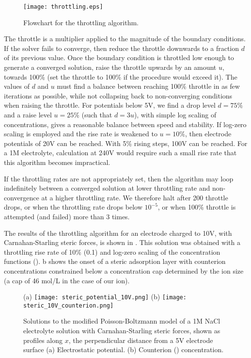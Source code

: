 \begin{figure}
\centering
\texttt{[image: throttling.eps]}
\caption{\label{fig_throttling_algorithm}Flowchart for the throttling algorithm. }
\end{figure}

The throttle is a multiplier
applied to the magnitude of the boundary conditions.
If the solver fails to converge, then reduce the throttle downwards to
a fraction $d$ of its previous value. Once the boundary
condition is throttled low enough to generate a converged solution, raise
the throttle upwards by an amount $u$, towards 100\% (set the throttle
to 100\% if the procedure would exceed it).  The values of $d$ and $u$
must find a balance between reaching 100\% throttle in as few
iterations as possible, while not collapsing back to non-converging
conditions when raising the throttle.  For potentials below 5V, we
find a drop level $d=75\%$ and a raise level $u=25\%$ (such that
$d=3u$), with simple log
scaling of concentrations, gives a reasonable balance between speed and
stability. If log-zero scaling is employed and the rise rate is
weakened to $u=10\%$, then electrode potentials of 20V can be
reached. With 5\% rising steps, 100V can be reached. For a 1M
electrolyte, calculation at 240V would require such a small rise rate
that this algorithm becomes impractical.

If the throttling rates are not appropriately set, then the algorithm
may loop indefinitely between a converged solution at lower throttling
rate and non-convergence at a higher throttling rate. We therefore
halt after 200 throttle drops, or when the throttling rate drops below
$10^{-5}$, or when 100\% throttle is attempted (and failed) more than 3 times.

The results of the throttling algorithm for an electrode charged to
10V, with Carnahan-Starling steric forces, is shown in
. This solution was obtained with a
throttling rise rate of 10\% (0.1) and log-zero scaling of the
concentration functions
(). b shows the onset
of a steric adsorption layer \cite{DagmawiParsons2022} with counterion
concentrations constrained below a concentration cap determined by the
ion size (a cap of 46 mol/L in the case of our  ion).

\begin{figure}
\centering
(a)
\texttt{[image: steric\_potential\_10V.png]}
(b)
\texttt{[image: steric\_10V\_counterion.png]}
\caption{\label{fig_results_throttling}Solutions to the modified
  Poisson-Boltzmann model of a 1M NaCl electrolyte solution with
  Carnahan-Starling steric forces, shown as profiles along $x$, the
  perpendicular distance from a 5V electrode surface (a) Electrostatic
  potential. (b) Counterion () concentration. }
\end{figure}

